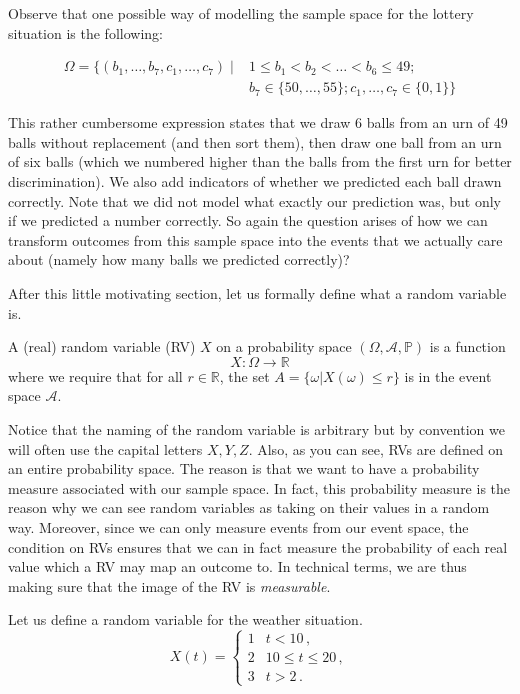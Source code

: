 \documentclass[a4paper,11pt,leqno]{report}
\begin{document}
Observe that one possible way of modelling the sample space for the lottery situation is the following:

\begin{align}
\Omega = \{(b_{1}, \ldots, b_{7}, c_{1}, \ldots, c_{7}) \mid &1 \leq b_{1} < b_2 < \ldots < b_{6} \leq 49;\\
&b_{7} \in \{50, \ldots, 55\}; c_{1}, \ldots, c_{7} \in \{0,1\} \} \nonumber
\end{align}

This rather cumbersome expression states that we draw 6 balls from an urn of 49 balls without replacement (and then sort them), then draw one ball from an urn of six balls (which we numbered higher than the balls from the first
urn for better discrimination). We also add indicators of whether we predicted each ball drawn correctly. Note that we did not model what exactly our prediction was, but only if we predicted a number correctly. So again the question arises of how we can transform outcomes from this sample space into
the events that we actually care about (namely how many balls we predicted correctly)?

\medskip
After this little motivating section, let us formally define what a random variable is.

\begin{Definition} 
A (real) random variable (RV) $X$ on a probability space $(\Omega, \mathcal{A}, \mathbb{P})$ is a function
$$ X: \Omega \rightarrow \mathbb{R} $$
where we require that for
all $ r \in \mathbb{R} $, the set $ A = \{\omega| X(\omega) \leq r\} $ is in the event space $ \mathcal{A}$.
\end{Definition}

Notice that the naming of the random variable is arbitrary but by convention we will often use the capital letters
$ X,Y,Z $. Also, as you can see, RVs are defined on an entire probability space. The reason is that
we want to have a probability measure associated with our sample space. 
In fact, this probability measure is the reason why we can see random variables as taking on their values
in a random way. Moreover, since we can only measure events from our event space, the condition on RVs
ensures that we can in fact measure the probability of each real value which a RV may map an outcome to.
In technical terms, we are thus making sure that the image of the RV is \textit{measurable}.

Let us define a random variable for the weather situation. 
\begin{equation} \label{weatherRV}
X(t) = 
\begin{cases}
1 & t < 10 \, , \\
2 & 10 \leq t \leq 20 \, ,\\
3 & t > 2 \, .
\end{cases}
\end{equation}
\end{document}
